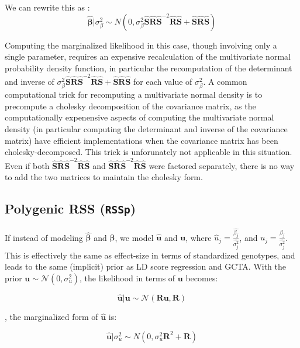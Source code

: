 We can rewrite this as :
$$\hat{\boldsymbol{\beta}}|\sigma_\beta^2 \sim  N(0,\sigma_\beta^2\hat{\textbf{S}}\hat{\textbf{R}}\hat{\textbf{S}}^{-2}\hat{\textbf{R}}\hat{\textbf{S}}+\hat{\textbf{S}}\hat{\textbf{R}}\hat{\textbf{S}}) $$

Computing the marginalized likelihood in this case, though involving only a single parameter, requires an expensive recalculation of the multivariate normal probability density function, in particular 
the recomputation of the determinant and inverse of \(\sigma_\beta^2\hat{\textbf{S}}\hat{\textbf{R}}\hat{\textbf{S}}^{-2}\hat{\textbf{R}}\hat{\textbf{S}}+\hat{\textbf{S}}\hat{\textbf{R}}\hat{\textbf{S}}\) for each value of 
\(\sigma_\beta^2\).  A common computational trick for recomputing a multivariate normal density is to precompute a cholesky decomposition of the covariance matrix, as the computationally expenensive aspects of computing the multivariate normal density (in particular computing the determinant and inverse of the covariance matrix) have efficient implementations when the covariance matrix has been cholesky-decomposed.  This trick is unforunately not applicable in this situation.  Even if both $\hat{\textbf{S}}\hat{\textbf{R}}\hat{\textbf{S}}^{-2}\hat{\textbf{R}}\hat{\textbf{S}}$ and $\hat{\textbf{S}}\hat{\textbf{R}}\hat{\textbf{S}}^{-2}\hat{\textbf{R}}\hat{\textbf{S}}$ were factored separately, there is no way to add the two matrices to maintain the cholesky form.


\subsection{Polygenic RSS (\texttt{RSSp})}\label{sec:org040cb73}

If instead of modeling \(\hat{\boldsymbol{\beta}}\) and \(\boldsymbol{\beta}\), we model $\hat{\textbf{u}}$ and $\textbf{u}$, where $\hat{u}_j=\frac{\hat{\beta_j}}{\hat{\sigma_j^2}}$, and  \(u_j=\frac{\beta_j}{\hat{\sigma_j^2}}\).  This is effectively the same as effect-size in terms of standardized genotypes, and leads to the same (implicit) prior as LD score regression\cite{ldsc} and GCTA\cite{GCTA}.  With the prior $\textbf{u} \sim \mathcal{N}(0,\sigma_u^2)$, the likelihood in terms of $\textbf{u}$ becomes:

$$\hat{\textbf{u}} | \textbf{u} \sim \mathcal{N}(\textbf{R} \textbf{u},\textbf{R})$$

, the marginalized form of $\hat{\textbf{u}}$ is:

\[ \hat{\textbf{u}}|\sigma_u^2 \sim N(0,\sigma_u^2\textbf{R}^2+\textbf{R})\]

